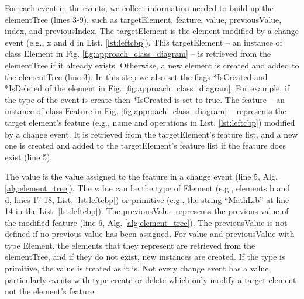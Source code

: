 \documentclass{jot}
\newcommand{\dk}[1]{\textcolor{blue}{\textbf{[Dimitris: #1]}}}
\begin{document}
    For each \textsf{event} in the \textsf{events}, we collect information needed to build up the \textsf{elementTree}  (lines 3-9), such as \textsf{targetElement}, \textsf{feature}, \textsf{value}, \textsf{previousValue}, \textsf{index}, and \textsf{previousIndex}. The \textsf{targetElement} is the element modified by a change event (e.g., \textsf{x} and \textsf{d} in List. \ref{lst:leftcbp}). This \textsf{targetElement} -- an instance of class Element in Fig. \ref{fig:approach_class_diagram} -- is retrieved from the \textsf{elementTree} if it already exists. Otherwise, a new element is created and added to the \textsf{elementTree} (line 3). In this step we also set the flags \textsf{*IsCreated} and \textsf{*IsDeleted} of the element in Fig. \ref{fig:approach_class_diagram}. For example, if the type of the event is \textsf{create} then \textsf{*IsCreated} is set to \textsf{true}. The \textsf{feature} -- an instance of class Feature in Fig. \ref{fig:approach_class_diagram} -- represents the target element's feature (e.g., \textsf{name} and \textsf{operations} in List. \ref{lst:leftcbp}) modified by a change event. It is retrieved from the \textsf{targetElement}'s feature list, and a new one is created and added to the \textsf{targetElement}'s feature list if the feature does exist (line 5). 
    
    The \textsf{value} is the value assigned to the feature in a change event (line 5, Alg. \ref{alg:element_tree}). The \textsf{value} can be the type of \textsf{Element} (e.g., elements \textsf{b} and  \textsf{d}, lines 17-18, List. \ref{lst:leftcbp}) or primitive (e.g., the string ``MathLib'' at line 14 in the List. \ref{lst:leftcbp}). The \textsf{previousValue} represents the previous value of the modified feature (line 6, Alg. \ref{alg:element_tree}). The \textsf{previousValue} is not defined if no previous value has been assigned. For \textsf{value} and \textsf{previousValue} with type \textsf{Element}, the elements that they represent are retrieved from the \textsf{elementTree}, and if they do not exist, new instances are created. If the type is primitive, the value is treated as it is. Not every change event has a \textsf{value}, particularly events with type \textsf{create} 
    or \textsf{delete} which only modify a target element not the element's feature.
    
\end{document}
